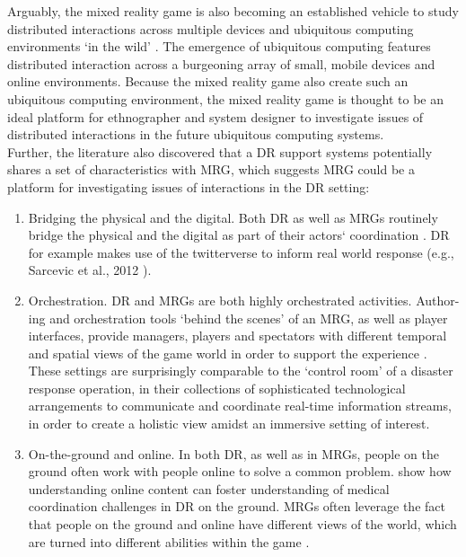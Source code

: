 Arguably, the mixed reality game is also becoming an established vehicle to study distributed interactions across multiple devices and ubiquitous computing environments `in the wild' \cite{Crabtree2006, Benford2005, Fischer2012}. The emergence of ubiquitous computing features distributed interaction across a burgeoning array of small, mobile devices and online environments. Because the mixed reality game also create such an ubiquitous computing environment,  the mixed reality game is thought to be an ideal platform for ethnographer and system designer to investigate issues of distributed interactions in the future ubiquitous computing systems.\\

Further, the literature \cite{Fischer2012} also discovered that a \ac{DR} support systems potentially shares a set of characteristics with \ac{MRG}, which suggests \ac{MRG} could be a platform for investigating issues of interactions in the \ac{DR} setting:\\

\begin{enumerate}
\item Bridging the physical and the digital. Both \ac{DR} as well as \ac{MRG}s routinely bridge the physical and the digital as part of their actors` coordination \cite{Benford2005}. \ac{DR} for example makes use of the twitterverse to inform real world response (e.g., Sarcevic et al., 2012 \cite{Sarcevic2012}).

\item Orchestration. \ac{DR} and \ac{MRG}s are both highly orchestrated activities. Author-ing and orchestration tools `behind the scenes' of an \ac{MRG}, as well as player interfaces, provide managers, players and spectators with different temporal and spatial views of the game world in order to support the experience \cite{Crabtree2004}. These settings are surprisingly comparable to the `control room' of a disaster response operation, in their collections of sophisticated technological arrangements to communicate and coordinate real-time information streams, in order to create a holistic view amidst an immersive setting of interest.\\

\item On-the-ground and online. In both \ac{DR}, as well as in \ac{MRG}s, people on the ground often work with people online to solve a common problem. \cite{Sarcevic2012} show how understanding online content can foster understanding of medical coordination challenges in \ac{DR} on the ground. \ac{MRG}s often leverage the fact that people on the ground and online have different views of the world, which are turned into different abilities within the game \cite{Flintham2003}.\\ 

\end{enumerate}

